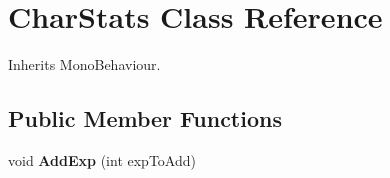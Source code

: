 \hypertarget{class_char_stats}{}\section{Char\+Stats Class Reference}
\label{class_char_stats}


Inherits Mono\+Behaviour.

\subsection*{Public Member Functions}
\begin{DoxyCompactItemize}
\item 
\mbox{\label{class_char_stats_a4d4e25c0d5c4eb77cc6b553dd4e37ad2}} 
void {\bfseries Add\+Exp} (int exp\+To\+Add)
\end{DoxyCompactItemize}
